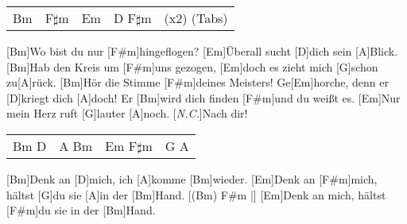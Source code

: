 \begin{guitar}
	 
	
	 {\footnotesize\begin{tabular}{l|l|l|ll}
			Bm & F$\sharp$m & Em & D F$\sharp$m & (x2) (Tabs)
	\end{tabular}}
	
	[Bm]Wo bist du nur [F#m]hingeflogen? [Em]{Ü}berall sucht [D]dich sein [A]Blick.
	[Bm]Hab den Kreis um [F#m]uns gezogen, [Em]doch es zieht mich [G]schon zu[A]rück.
	[Bm]Hör die Stimme [F#m]deines Meisters! Ge[Em]horche, denn er [D]kriegt dich [A]doch!
	Er [Bm]wird dich finden [F#m]und du weißt es. [Em]Nur mein Herz ruft [G]lauter [A]noch.
	[\textit{N.C.}]Nach dir!
	
	 
	
	{\footnotesize\begin{tabular}{l|l|l|l}
			Bm D & A Bm  & Em F$\sharp$m & G A
	\end{tabular}}

	[Bm]Denk an [D]mich, ich [A]komme [Bm]wieder. [Em]Denk an [F#m]mich, hältst [G]du sie [A]in der [Bm]Hand.
	[(Bm) F#m |] [Em]Denk an mich, hältst [F#m]du sie in der [Bm]Hand.
\end{guitar}